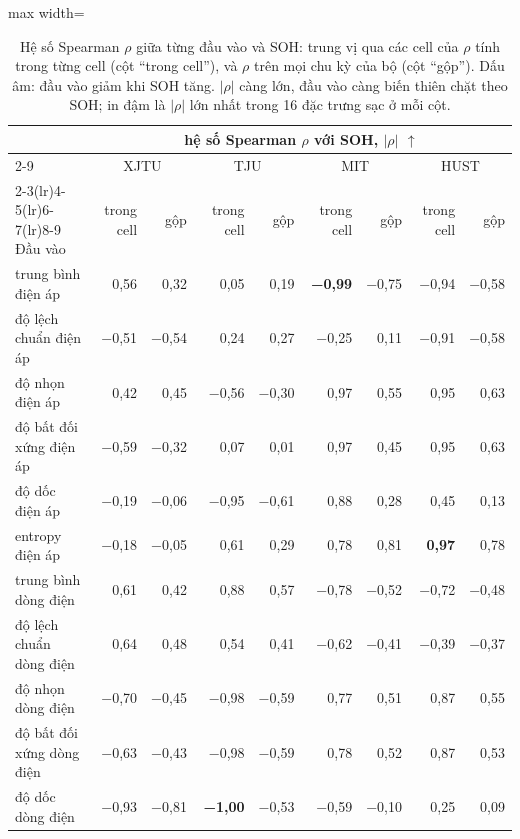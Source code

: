 \begin{table}[!htbp]\centering\small\setlength{\tabcolsep}{4pt}
\caption[Tương quan hạng giữa từng đầu vào và SOH]{Hệ số Spearman $\rho$ giữa từng đầu vào và SOH: trung vị qua các cell của $\rho$ tính trong từng cell (cột “trong cell”), và $\rho$ trên mọi chu kỳ của bộ (cột “gộp”). Dấu âm: đầu vào giảm khi SOH tăng. $|\rho|$ càng lớn, đầu vào càng biến thiên chặt theo SOH; in đậm là $|\rho|$ lớn nhất trong 16 đặc trưng sạc ở mỗi cột.}\label{tab:relevance}
\begin{adjustbox}{max width=\textwidth}\begin{tabular}{lrrrrrrrr}\toprule
 & \multicolumn{8}{c}{hệ số Spearman $\rho$ với SOH, $|\rho|$ $\uparrow$} \\\cmidrule(lr){2-9}
 & \multicolumn{2}{c}{XJTU} & \multicolumn{2}{c}{TJU} & \multicolumn{2}{c}{MIT} & \multicolumn{2}{c}{HUST} \\\cmidrule(lr){2-3}\cmidrule(lr){4-5}\cmidrule(lr){6-7}\cmidrule(lr){8-9}
Đầu vào & trong cell & gộp & trong cell & gộp & trong cell & gộp & trong cell & gộp \\\midrule
trung bình điện áp & 0{,}56 & 0{,}32 & 0{,}05 & 0{,}19 & \textbf{−0{,}99} & −0{,}75 & −0{,}94 & −0{,}58 \\
độ lệch chuẩn điện áp & −0{,}51 & −0{,}54 & 0{,}24 & 0{,}27 & −0{,}25 & 0{,}11 & −0{,}91 & −0{,}58 \\
độ nhọn điện áp & 0{,}42 & 0{,}45 & −0{,}56 & −0{,}30 & 0{,}97 & 0{,}55 & 0{,}95 & 0{,}63 \\
độ bất đối xứng điện áp & −0{,}59 & −0{,}32 & 0{,}07 & 0{,}01 & 0{,}97 & 0{,}45 & 0{,}95 & 0{,}63 \\
độ dốc điện áp & −0{,}19 & −0{,}06 & −0{,}95 & −0{,}61 & 0{,}88 & 0{,}28 & 0{,}45 & 0{,}13 \\
entropy điện áp & −0{,}18 & −0{,}05 & 0{,}61 & 0{,}29 & 0{,}78 & 0{,}81 & \textbf{0{,}97} & 0{,}78 \\
\addlinespace[2pt]
trung bình dòng điện & 0{,}61 & 0{,}42 & 0{,}88 & 0{,}57 & −0{,}78 & −0{,}52 & −0{,}72 & −0{,}48 \\
độ lệch chuẩn dòng điện & 0{,}64 & 0{,}48 & 0{,}54 & 0{,}41 & −0{,}62 & −0{,}41 & −0{,}39 & −0{,}37 \\
độ nhọn dòng điện & −0{,}70 & −0{,}45 & −0{,}98 & −0{,}59 & 0{,}77 & 0{,}51 & 0{,}87 & 0{,}55 \\
độ bất đối xứng dòng điện & −0{,}63 & −0{,}43 & −0{,}98 & −0{,}59 & 0{,}78 & 0{,}52 & 0{,}87 & 0{,}53 \\
độ dốc dòng điện & −0{,}93 & −0{,}81 & \textbf{−1{,}00} & −0{,}53 & −0{,}59 & −0{,}10 & 0{,}25 & 0{,}09 \\

\end{tabular}
\end{adjustbox}
\end{table}
